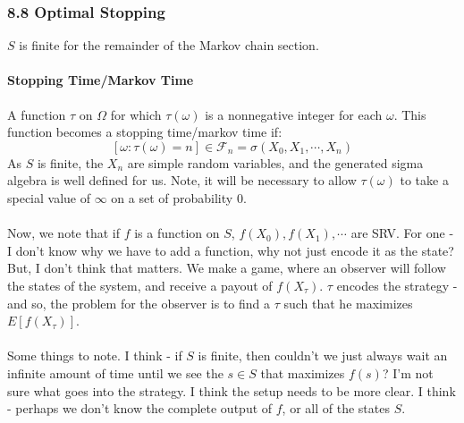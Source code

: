 \documentclass[12pt,a4paper]{article}
\newcommand{\1}[1]{\mathbbm{1}\left\{ #1 \right\}}
\newcommand{\fcal}{\mathcal{F}}
\begin{document}
\subsubsection{8.8 Optimal Stopping} $S$ is finite for the remainder of the Markov chain section.

\paragraph{Stopping Time/Markov Time} A function $\tau$ on $\Omega$ for which $\tau(\omega)$ is a nonnegative integer for each $\omega$. This function becomes a stopping time/markov time if:
$$
	\left[\omega : \tau(\omega) = n\right] \in \fcal_n = \sigma(X_0, X_1, \cdots, X_n)
$$
As $S$ is finite, the $X_n$ are simple random variables, and the generated sigma algebra is well defined for us. Note, it will be necessary to allow $\tau(\omega)$ to take a special value of $\infty$ on a set of probability $0$.
\\\\
Now, we note that if $f$ is a function on $S$, $f(X_0), f(X_1), \cdots$ are SRV. For one - I don't know why we have to add a function, why not just encode it as the state? But, I don't think that matters. We make a game, where an observer will follow the states of the system, and receive a payout of $f(X_\tau)$. $\tau$ encodes the strategy - and so, the problem for the observer is to find a $\tau$ such that he maximizes $E[f(X_\tau)]$.
\\\\
Some things to note. I think - if $S$ is finite, then couldn't we just always wait an infinite amount of time until we see the $s \in S$ that maximizes $f(s)$? I'm not sure what goes into the strategy. I think the setup needs to be more clear. I think - perhaps we don't know the complete output of $f$, or all of the states $S$. 
\end{document}
